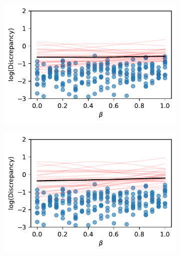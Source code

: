 \begin{figure}[htbp]
    \centering
    \begin{subfigure}[b]{0.5\textwidth}
        \centering
        \includegraphics[width=\textwidth]{
            ../champagne_GP_images/initial_beta_slice_log_discrep.pdf
        }
    \end{subfigure}%
    \hfill%
    \begin{subfigure}[b]{0.5\textwidth}
        \centering
        \includegraphics[width=\textwidth]{
            ../champagne_GP_images/beta_slice_100_bolfi_updates_log_discrep.pdf
        }
    \end{subfigure}
    \hfill%
    \begin{subfigure}[b]{0.5\textwidth}
        \centering

\end{subfigure}
\end{figure}
